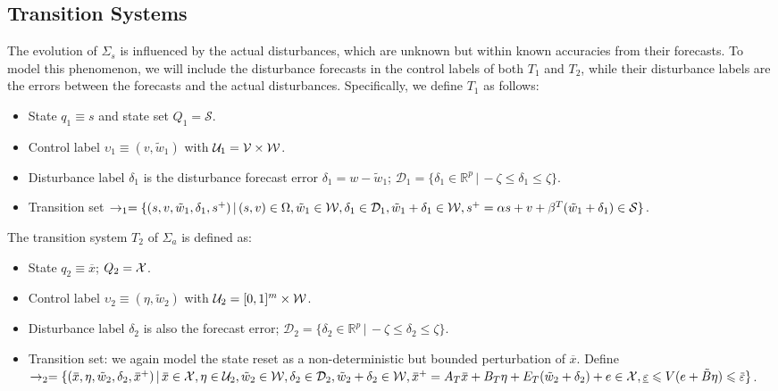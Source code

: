 
\subsection{Transition Systems}
\label{sec:abstraction-gs:feedback:Ts}

The evolution of $\Sigma_{s}$ %
is influenced by the actual disturbances, which are unknown but within known accuracies from their forecasts.
To model this phenomenon, we will include the disturbance forecasts in the control labels of both $T_{1}$ and $T_{2}$, while their disturbance labels are the errors between the forecasts and the actual disturbances.
Specifically, we define $T_{1}$ as follows:
\begin{itemize}
\item State $q_{1} \equiv s$ and state set $Q_{1} = \mathcal{S}$.
\item Control label $\upsilon_{1} \equiv (v, \tilde{w}_{1})$ with $\mathcal{U}_{1} = \mathcal{V} \times \mathcal{W}$.
\item Disturbance label $\delta_{1}$ is the disturbance forecast error $\delta_{1} = w - \tilde{w}_{1}$; $\mathcal{D}_{1} = \{ \delta_{1} \in \mathbb{R}^{p} \,|\, -\zeta \leqslant \delta_{1} \leqslant \zeta\}$.
\item Transition set $\rightarrow_{1} = \{ (s, v, \tilde{w}_{1}, \delta_{1}, s^{+}) \,|\, (s,v) \in \Omega,\allowbreak \tilde{w}_{1} \in \mathcal{W},\allowbreak \delta_{1} \in \mathcal{D}_{1},\allowbreak \tilde{w}_{1} + \delta_{1} \in \mathcal{W},\allowbreak s^{+} = \alpha s + v + \beta^{T} (\tilde{w}_{1} + \delta_{1}) \in \mathcal{S}\}$. %
\end{itemize}
%
The transition system $T_{2}$ of $\Sigma_{a}$ is defined as:
\begin{itemize}
\item State $q_{2} \equiv \overbar{x}$; $Q_{2} = \mathcal{X}$.
\item Control label $\upsilon_{2} \equiv (\eta, \tilde{w}_{2})$ with $\mathcal{U}_{2} = [0,1]^{m} \times \mathcal{W}$.
\item Disturbance label $\delta_{2}$ is also the forecast error; $\mathcal{D}_{2} = \{ \delta_{2} \in \mathbb{R}^{p} \,|\, -\zeta \leqslant \delta_{2} \leqslant \zeta\}$.
\item Transition set: we again model the state reset as a non-deterministic but bounded perturbation of $\overbar{x}$.   Define $\rightarrow_{2} = \{ (\overbar{x}, \eta, \tilde{w}_{2}, \delta_{2}, \overbar{x}^{+}) \,|\, \overbar{x} \in \XSet, \eta \in \mathcal{U}_{2}, \tilde{w}_{2} \in \WSet,\allowbreak \delta_{2} \in \mathcal{D}_{2},\allowbreak \tilde{w}_{2} + \delta_{2} \in \WSet,\allowbreak \overbar{x}^{+} = A_{T} \overbar{x}+ B_{T} \eta + E_{T} (\tilde{w}_{2} + \delta_{2}) + e \in \XSet,\allowbreak \underline{\varepsilon} \leqslant V (e + \tilde{B} \eta) \leqslant \overbar{\varepsilon}\}$.
\end{itemize}
